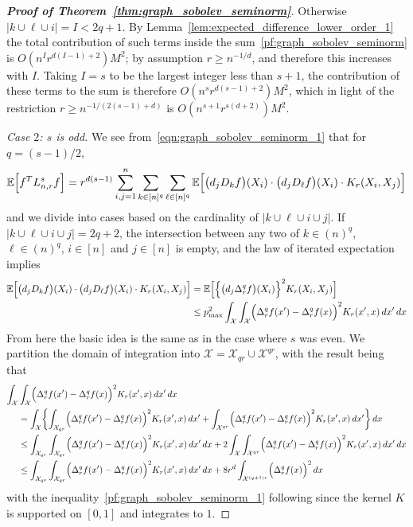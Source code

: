 \documentclass{article}
\newcommand{\abs}[1]{\left \lvert #1 \right \rvert}
\newcommand{\1}{\mathbf{1}}
\newcommand{\Lap}{L}
\newcommand{\Xset}{\mathcal{X}}
\newcommand{\Ebb}{\mathbb{E}}
\theoremstyle{alden}
\theoremstyle{aldenthm}
\theoremstyle{definition}
\theoremstyle{remark}
\begin{document}
\begin{proof}[\textbf{Proof of Theorem~\ref{thm:graph_sobolev_seminorm}}]
	Otherwise $\abs{k \cup \ell \cup i} = I < 2q + 1$. By Lemma~\ref{lem:expected_difference_lower_order_1} the total contribution of such terms inside the sum~\eqref{pf:graph_sobolev_seminorm} is $O(n^{I}r^{d(I - 1) + 2}) M^2$; by assumption $r \geq n^{-1/d}$, and therefore this increases with $I$. Taking $I = s$ to be the largest integer less than $s + 1$, the contribution of these terms to the sum is therefore $O(n^sr^{d(s - 1) + 2})M^2$, which in light of the restriction $r \geq n^{-1/(2(s - 1) + d)}$ is $O(n^{s+1}r^{s(d +2)})M^2$.
	
	\textit{Case $2$: $s$ is odd.} We see from~\eqref{eqn:graph_sobolev_seminorm_1} that for $q = (s - 1)/2$,
	\begin{equation}
	\label{pf:graph_sobolev_seminorm_4}
	\Ebb\Bigl[f^T \Lap_{n,r}^s f\Bigr] = r^{d(s - 1)}\sum_{i,j = 1}^{n} \sum_{k \in [n]^q} \sum_{\ell \in [n]^q} \Ebb\Bigl[\bigl(d_jD_kf\bigr)(X_i) \cdot  \bigl(d_jD_{\ell}f\bigr)(X_i) \cdot K_r(X_i,X_j)\Bigr]
	\end{equation}
	and we divide into cases based on the cardinality of $\abs{k \cup \ell \cup i \cup j}$. If $\abs{k \cup \ell \cup i \cup j} = 2q + 2$, the intersection between any two of $k \in (n)^q$, $\ell \in (n)^q$, $i \in [n]$ and $j \in [n]$ is empty, and the law of iterated expectation implies
	\begin{align}
	\Ebb\Bigl[\bigl(d_jD_kf\bigr)(X_i) \cdot  \bigl(d_jD_{\ell}f\bigr)(X_i) \cdot K_r(X_i,X_j)\Bigr] & =\Ebb\Bigl[\Bigl\{\bigl(d_j\Delta_r^qf\bigr)(X_i)\Bigr\}^2  K_r(X_i,X_j)\Bigr] \nonumber \\
	&\leq p_{\max}^2 \int_{\Xset} \int_{\Xset} \Bigl(\Delta_r^qf(x') - \Delta_r^qf(x)\Bigr)^2 K_r(x',x) \,dx' \,dx \label{pf:graph_sobolev_seminorm_3}
	\end{align}
	From here the basic idea is the same as in the case where $s$ was even. We partition the domain of integration into $\Xset = \Xset_{qr} \cup \Xset^{qr}$, with the result being that
	\begin{align}
	\int_{\Xset} & \int_{\Xset} \Bigl(\Delta_r^qf(x') - \Delta_r^qf(x)\Bigr)^2 K_r(x',x) \,dx' \,dx \nonumber \\ & = \int_{\Xset} \biggl\{\int_{\Xset_{qr}} \Bigl(\Delta_r^qf(x') - \Delta_r^qf(x)\Bigr)^2 K_r(x',x) \,dx' + \int_{\Xset^{qr}} \Bigl(\Delta_r^qf(x') - \Delta_r^qf(x)\Bigr)^2 K_r(x',x) \,dx'\biggr\}\,dx \nonumber \\
	& \leq \int_{\Xset_{qr}} \int_{\Xset_{qr}} \Bigl(\Delta_r^qf(x') - \Delta_r^qf(x)\Bigr)^2 K_r(x',x) \,dx' \,dx + 2 \int_{\Xset} \int_{\Xset^{qr}} \Bigl(\Delta_r^qf(x') - \Delta_r^qf(x)\Bigr)^2 K_r(x',x) \,dx'\,dx \nonumber \\ 
	& \leq \int_{\Xset_{qr}} \int_{\Xset_{qr}} \Bigl(\Delta_r^qf(x') - \Delta_r^qf(x)\Bigr)^2 K_r(x',x) \,dx' \,dx + 8 r^d \int_{\Xset^{(q + 1)r}} \Bigl(\Delta_r^qf(x)\Bigr)^2 \,dx \label{pf:graph_sobolev_seminorm_1}
	\end{align}
	with the inequality~\eqref{pf:graph_sobolev_seminorm_1} following since the kernel $K$ is supported on $[0,1]$ and integrates to $1$. 
	

\end{proof}
\end{document}
